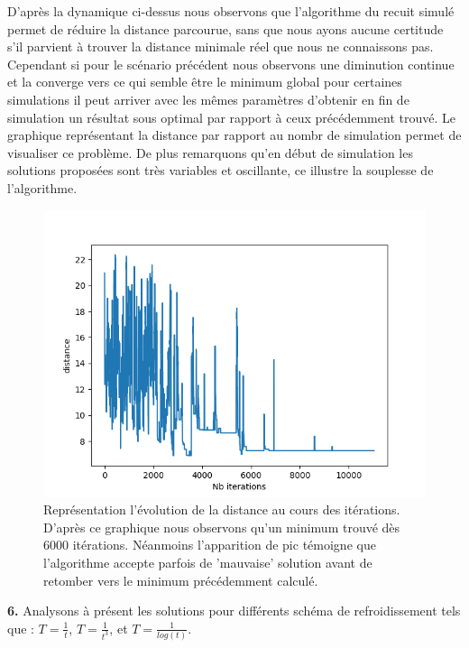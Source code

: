 \documentclass[12pt]{article}
\begin{document}
\begin{minipage}{0.5\textwidth}
D'après la dynamique ci-dessus nous observons que l'algorithme du recuit simulé permet de réduire la distance parcourue, sans que nous ayons aucune certitude s'il parvient à trouver la distance minimale réel que nous ne connaissons pas. Cependant si pour le scénario précédent nous observons une diminution continue et la converge vers ce qui semble être le minimum global pour certaines simulations il peut arriver avec les mêmes paramètres d'obtenir en fin de simulation un résultat sous optimal par rapport à ceux précédemment trouvé. Le graphique représentant la distance par rapport au nombr de simulation permet de visualiser ce problème. De plus remarquons qu'en début de simulation les solutions proposées sont très variables et oscillante, ce illustre la souplesse de l'algorithme.

\end{minipage} \hfill
\begin{minipage}{0.45\textwidth}
\begin{figure}[H]
\includegraphics[width=1\textwidth]{distance_2.png}
\caption{Représentation l'évolution de la distance au cours des itérations. D'après ce graphique nous observons qu'un minimum trouvé dès 6000 itérations. Néanmoins l'apparition de pic témoigne que l'algorithme accepte parfois de 'mauvaise' solution avant de retomber vers le minimum précédemment calculé.  }
\label{Q2KP}
\end{figure}
\end{minipage}
\textbf{\color{brick}6.}  Analysons à présent les solutions pour différents schéma de refroidissement tels que :
 $T =\frac{1}{t}$,
  $T =\frac{1}{t^3}$,
 et $T =\frac{1}{log(t)}$.\\
 
\end{document}
